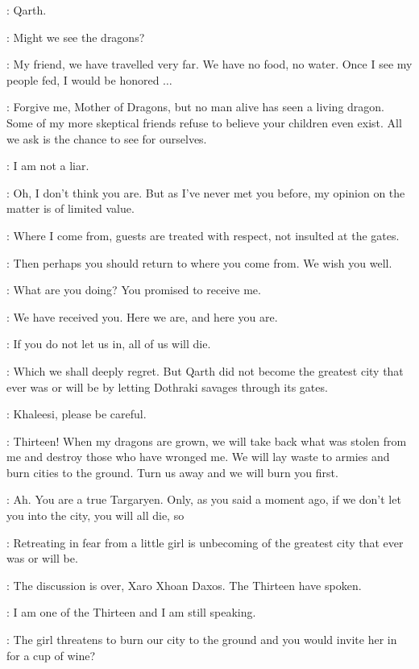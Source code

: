\DAENERYS: Qarth. 

\SPICEKING: Might we see the dragons? 

\DAENERYS: My friend, we have travelled very far. We have no food, no water. Once I see my people fed, I would be honored $\ldots$  

\SPICEKING: Forgive me, Mother of Dragons, but no man alive has seen a living dragon. Some of my more skeptical friends refuse to believe your children even exist. All we ask is the chance to see for ourselves. 

\DAENERYS: I am not a liar. 

\SPICEKING: Oh, I don't think you are. But as I've never met you before, my opinion on the matter is of limited value. 

\DAENERYS: Where I come from, guests are treated with respect, not insulted at the gates. 

\SPICEKING: Then perhaps you should return to where you come from. We wish you well. 


\DAENERYS: What are you doing? You promised to receive me. 

\SPICEKING: We have received you. Here we are, and here you are. 

\DAENERYS: If you do not let us in, all of us will die. 

\SPICEKING: Which we shall deeply regret. But Qarth did not become the greatest city that ever was or will be by letting Dothraki savages through its gates. 

\JORAH: Khaleesi, please be careful. 

\DAENERYS: Thirteen!  When my dragons are grown, we will take back what was stolen from me and destroy those who have wronged me. We will lay waste to armies and burn cities to the ground. Turn us away and we will burn you first. 

\SPICEKING: Ah. You are a true Targaryen. Only, as you said a moment ago, if we don't let you into the city, you will all die, so  

\XARO: Retreating in fear from a little girl is unbecoming of the greatest city that ever was or will be.

\SPICEKING: The discussion is over, Xaro Xhoan Daxos. The Thirteen have spoken. 

\XARO: I am one of the Thirteen and I am still speaking. 

\SPICEKING: The girl threatens to burn our city to the ground and you would invite her in for a cup of wine? 

